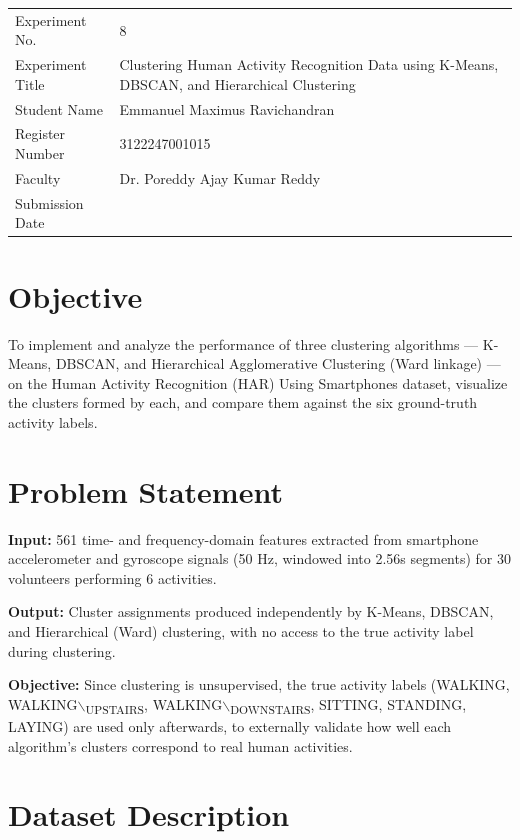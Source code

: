 \documentclass[12pt,a4paper]{article}
\author{Emmanuel Maximus}
\date{\today}
\title{}
\begin{document}
\begin{center}
\begin{tabular}{ll}
\hline
Experiment No. & 8\\
Experiment Title & Clustering Human Activity Recognition Data using K-Means, DBSCAN, and Hierarchical Clustering\\
Student Name & Emmanuel Maximus Ravichandran\\
Register Number & 3122247001015\\
Faculty & Dr. Poreddy Ajay Kumar Reddy\\
Submission Date & \\
\hline
\end{tabular}
\end{center}

\section{Objective}
\label{sec:orgbd7e6d4}

To implement and analyze the performance of three clustering algorithms —
K-Means, DBSCAN, and Hierarchical Agglomerative Clustering (Ward linkage) —
on the Human Activity Recognition (HAR) Using Smartphones dataset, visualize
the clusters formed by each, and compare them against the six ground-truth
activity labels.

\section{Problem Statement}
\label{sec:orgaa169c7}

\textbf{Input:} 561 time- and frequency-domain features extracted from smartphone
accelerometer and gyroscope signals (50 Hz, windowed into 2.56s segments)
for 30 volunteers performing 6 activities.

\textbf{Output:} Cluster assignments produced independently by K-Means, DBSCAN, and
Hierarchical (Ward) clustering, with no access to the true activity label
during clustering.

\textbf{Objective:} Since clustering is unsupervised, the true activity labels
(WALKING, WALKING$\backslash$\textsubscript{UPSTAIRS}, WALKING$\backslash$\textsubscript{DOWNSTAIRS}, SITTING, STANDING, LAYING)
are used only afterwards, to externally validate how well each algorithm's
clusters correspond to real human activities.

\section{Dataset Description}
\label{sec:org480cf92}
\end{document}
